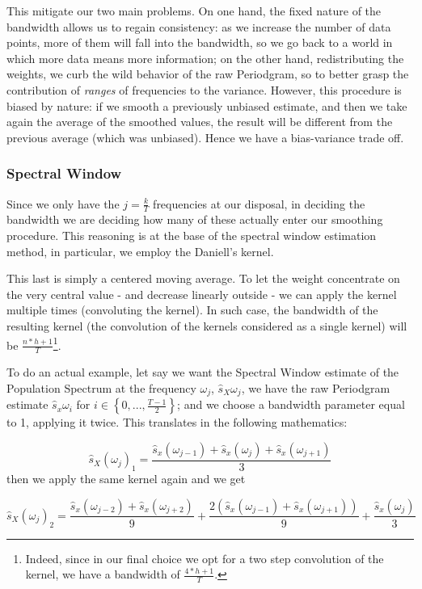 \documentclass[12pt]{article} %
\begin{document}
This mitigate our two main problems. On one hand, the fixed nature of the bandwidth allows us to regain consistency: as we increase the number of data points, more of them will fall into the bandwidth, so we go back to a world in which more data means more information; on the other hand, redistributing the weights, we curb the wild behavior of the raw Periodgram, so to better grasp the contribution of {\em ranges} of frequencies to the variance. However, this procedure is biased by nature: if we smooth a previously unbiased estimate, and then we take again the average of the smoothed values, the result will be different from the previous average (which was unbiased). Hence we have a bias-variance trade off.
 
\subsubsection{Spectral Window}

Since we only have the  $j=\frac{k}{T}$ frequencies at our disposal, in deciding the bandwidth we are deciding how many of these actually enter our smoothing procedure. This reasoning is at the base of the spectral window estimation method, in particular, we employ the Daniell's kernel. 

This last is simply a centered moving average. To let the weight concentrate on the very central value - and decrease linearly outside - we can apply the kernel multiple times (convoluting the kernel). In such case, the bandwidth of the resulting kernel (the convolution of the kernels considered as a single kernel) will be $\frac{n*h+1}{T}$\footnote{
Indeed, since in our final choice we opt for a two step convolution of the kernel, we have a bandwidth of $\frac{4*h+1}{T}$.}.

To do an actual example, let say we want the Spectral Window estimate of the Population Spectrum at the frequency $\omega_j$, $\hat{s}_X{\omega_j}$, we have the raw Periodgram estimate $\hat{s}_x{\omega_i}$ for $i\in\left\{0,...,\frac{T-1}{2}\right\}$; and we choose a bandwidth parameter equal to 1, applying it twice. This translates in the following mathematics:

\begin{equation}
\hat{s}_X(\omega_j)_1=\frac{\hat{s}_x(\omega_{j-1})+\hat{s}_x(\omega_j)+\hat{s}_x(\omega_{j+1})}{3}
\end{equation} then we apply the same kernel again and we get

\begin{equation}
\hat{s}_X(\omega_j)_2=\frac{\hat{s}_x(\omega_{j-2})+\hat{s}_x(\omega_{j+2})}{9}+\frac{2(\hat{s}_x(\omega_{j-1})+\hat{s}_x(\omega_{j+1}))}{9}+\frac{\hat{s}_x(\omega_j)}{3}
\end{equation}
\end{document}
